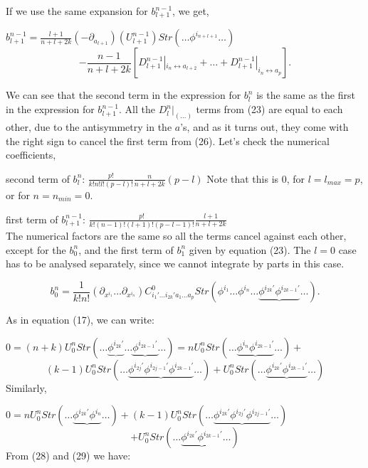\documentclass[a4paper,12pt]{article}
\begin{document}
If we use the same expansion for $b^{n-1}_{l+1}$, we get,
\begin{center}
$b^{n-1}_{l+1}=\frac{l+1}{n+l+2k}(-\partial_{a_{l+1}})(U^{n-1}_{l+1})Str\left(\ldots \phi^{i_{n+l+1}}\ldots \right)$
\begin{equation}
-\frac{n-1}{n+l+2k}\left[D^{n-1}_{l+1}|_{i_n\leftrightarrow a_{l+2}}+\ldots +D^{n-1}_{l+1}|_{i_n\leftrightarrow a_p}\right].
\end{equation}
\end{center}
We can see that the second  term in the expression for $b^n_l$ is the same as the first in the expression for $b^{n-1}_{l+1}$. All the $D^n_l|_{(\ldots )}$ terms from (23) are equal to each other, due to the antisymmetry in the $a$'s, and as it turns out, they come with the right sign to cancel the first  term from (26). Let's check the numerical coefficients,

second term of $b^n_l$: $\frac{p!}{k!n!l!(p-l)!}\frac{n}{n+l+2k}(p-l) $\newline
Note that this is 0, for $l=l_{max}=p$, or for $n=n_{min}=0$. 

first term of $b^{n-1}_{l+1}$:  $\frac{p!}{k!(n-1)!(l+1)!(p-l-1)!}\frac{l+1}{n+l+2k}$ \\
The numerical factors are the same so all the terms cancel against each other, except for the $b^n_0$, and the first term of $b^n_1$ given by equation (23). 
The  $l=0$ case has to be analysed separately, since we cannot integrate by parts in this case. 


\begin{equation}
b^n_0= \frac{1}{k!n!}(\partial_{x^{i_1}}\ldots \partial_{x^{i_n}})C^0_{i_1'\ldots i_{2k}'a_1\ldots a_p}Str\left(\phi^{i_1}\ldots \phi^{i_n}\ldots \underbrace{\phi^{i_{2k}'}\phi^{i_{2k-1}'}}\ldots \right).
\end{equation}

As in  equation (17), we can write:

$0=(n+k) U^n_0 Str\left(\ldots \underbrace{\phi^{i_{2k}'}}\ldots \underbrace{\phi^{i_{2k-1}'}}\ldots \right)=nU^n_0Str\left(\ldots \underbrace{\phi^{i_n}\phi^{i_{2k-1}'}}\ldots \right)+$
\begin{equation}
(k-1)U^n_0Str\left(\ldots \underbrace{\phi^{i_{2j}'}\phi^{i_{2j-1}'}\phi^{i_{2k-1}'}}\ldots \right)+U^n_0Str\left(\ldots \underbrace{\phi^{i_{2k}'}\phi^{i_{2k-1}'}}\ldots \right)
\end{equation}
Similarly,

$0=n U^n_0Str\left(\ldots \underbrace{\phi^{i_{2k}'}\phi^{i_n}}\ldots \right)+(k-1)U^n_0Str\left(\ldots \underbrace{\phi^{i_{2k}'}\phi^{i_{2j}'}\phi^{i_{2j-1}'}}\ldots \right)$
\begin{equation}
+U^n_0Str\left(\ldots \underbrace{\phi^{i_{2k}'}\phi^{i_{2k-1}'}}\ldots \right)
\end{equation}
From (28) and (29) we have:
\end{document}
